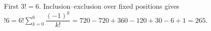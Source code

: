 First $ 3!=6 $. Inclusion--exclusion over fixed positions gives $!6=6!\sum_{k=0}^6\dfrac{(-1)^k}{k!}=720-720+360-120+30-6+1=\boxed{265}$.
